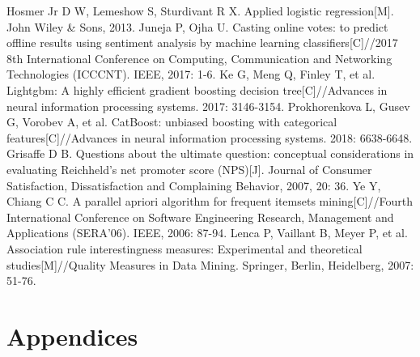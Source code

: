 \documentclass[12pt]{article}%
\begin{document}
\begin{thebibliography}{9}
	Hosmer Jr D W, Lemeshow S, Sturdivant R X. Applied logistic regression[M]. John Wiley \& Sons, 2013.
	Juneja P, Ojha U. Casting online votes: to predict offline results using sentiment analysis by machine learning classifiers[C]//2017 8th International Conference on Computing, Communication and Networking Technologies (ICCCNT). IEEE, 2017: 1-6.
	Ke G, Meng Q, Finley T, et al. Lightgbm: A highly efficient gradient boosting decision tree[C]//Advances in neural information processing systems. 2017: 3146-3154.
	Prokhorenkova L, Gusev G, Vorobev A, et al. CatBoost: unbiased boosting with categorical features[C]//Advances in neural information processing systems. 2018: 6638-6648.
	Grisaffe D B. Questions about the ultimate question: conceptual considerations in evaluating Reichheld's net promoter score (NPS)[J]. Journal of Consumer Satisfaction, Dissatisfaction and Complaining Behavior, 2007, 20: 36.
	Ye Y, Chiang C C. A parallel apriori algorithm for frequent itemsets mining[C]//Fourth International Conference on Software Engineering Research, Management and Applications (SERA'06). IEEE, 2006: 87-94.
	Lenca P, Vaillant B, Meyer P, et al. Association rule interestingness measures: Experimental and theoretical studies[M]//Quality Measures in Data Mining. Springer, Berlin, Heidelberg, 2007: 51-76.
	
\end{thebibliography}


\newpage
\appendix
\section*{Appendices}\label{Appendices}
\end{document}
